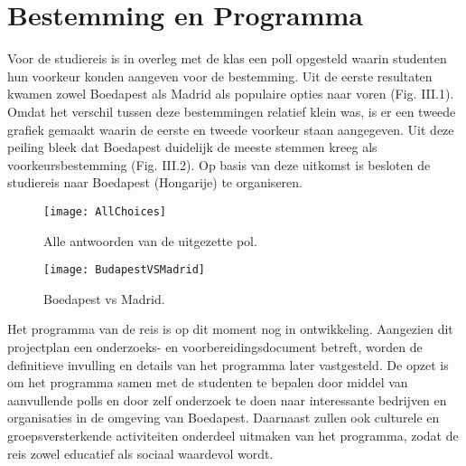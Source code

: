 \section{Bestemming en Programma}

Voor de studiereis is in overleg met de klas een poll opgesteld waarin studenten hun voorkeur konden aangeven voor de bestemming. Uit de eerste resultaten kwamen zowel Boedapest als Madrid als populaire opties naar voren (Fig. III.1). Omdat het verschil tussen deze bestemmingen relatief klein was, is er een tweede grafiek gemaakt waarin de eerste en tweede voorkeur staan aangegeven. Uit deze peiling bleek dat Boedapest duidelijk de meeste stemmen kreeg als voorkeursbestemming (Fig. III.2). Op basis van deze uitkomst is besloten de studiereis naar Boedapest (Hongarije) te organiseren.

\begin{figure}[h!]
	\centering
	\texttt{[image: AllChoices]}
	\label{fig:AllChoices}
	\caption{Alle antwoorden van de uitgezette pol.}
\end{figure}

\begin{figure}[h!]
	\centering
	\texttt{[image: BudapestVSMadrid]}
	\label{fig:MadridVsBoedapest}
	\caption{Boedapest vs Madrid.}
\end{figure}

\newpage

Het programma van de reis is op dit moment nog in ontwikkeling. Aangezien dit projectplan een onderzoeks- en voorbereidingsdocument betreft, worden de definitieve invulling en details van het programma later vastgesteld. De opzet is om het programma samen met de studenten te bepalen door middel van aanvullende polls en door zelf onderzoek te doen naar interessante bedrijven en organisaties in de omgeving van Boedapest. Daarnaast zullen ook culturele en groepsversterkende activiteiten onderdeel uitmaken van het programma, zodat de reis zowel educatief als sociaal waardevol wordt.